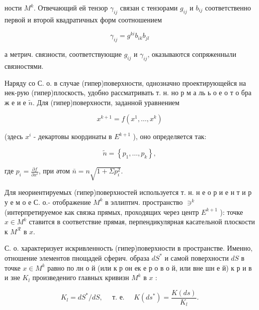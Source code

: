 \documentclass[10pt]{article}
\begin{document}
ности $M^{k}$. Отвечающий ей тензор $\gamma_{i j}$ связан с тензорами $g_{i j}$ и $b_{i j}$ соответственно первой и второй квадратичных форм соотношением



\[

\gamma_{i j}=g^{k i} b_{i k} b_{j l}

\]



а метрич. связности, соответствующие $g_{i j}$ и $\gamma_{i j}$, оказываются сопряженныли связностями.



Наряду со С. о. в случае (гипер)поверхности, однозначно проектирующейся на нек-рую (гипер)плоскость, удобно рассматривать т. н. но р м а ль ь о е о т о бра ж е и е $\tilde{n}$. Для (гипер)поверхности, заданной уравнением



\[

x^{k+1}=f\left(x^{1}, \ldots, x^{k}\right)

\]



(здесь $x^{i}$ - декартовы координаты в $E^{k+1}$ ), оно определяется так:



\[

\tilde{n}=\left\{p_{1}, \ldots, p_{k}\right\},

\]



где $p_{i}=\frac{\partial f}{\partial x^{i}}$, при әтом $\bar{n}=n \sqrt{1+\Sigma p_{i}^{2}}$.



Для неориентируемых (гипер)поверхностей используется т. н. н е о р и е н т и р у е м о е С. о.- отображение $M^{k}$ в эллиптич. пространство $\ni^{k}$ (интерпретируемое как связка прямых, проходящих через центр $E^{k+1}$ ): точке $x \in M^{k}$ ставится в соответствие прямая, перпендикулярная касательной плоскости к $M^{\mathcal{R}}$ в $x$.



С. о. характеризует искривленность (гипер)поверхности в пространстве. Именно, отношение элементов пнощадей сферич. образа $d S^{*}$ и самой поверхности $d S$ в точке $x \in M^{k}$ равно по лн о й (или к р он ек е р о в о й, или вне шн е й) к р и в и зне $K_{l}$ произведениго главных кривизн $M^{k}$ в $x$ :



\[

K_{l}=d S^{*} / d S, \quad \text { т. е. } \quad K\left(d s^{*}\right)=\frac{K(d s)}{K_{l}} .

\]
\end{document}
